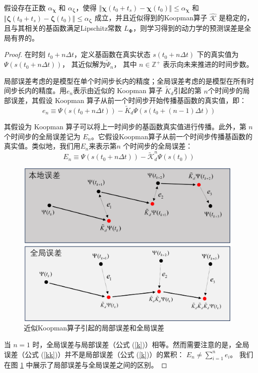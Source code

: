 \documentclass[lang=chs, degree=master, blindreview=false, winfonts=true]{yanputhesis}
\begin{document}
\begin{theorem}\label{error_boundness}
	假设存在正数 $\alpha_{\bm{\chi}}$ 和 $\alpha_{\bm{\zeta}}$，使得 $\Vert \bm{\chi}(t_0+t_s)-\bm{\chi}(t_0)\Vert \le \alpha_{\bm{\chi}}$ 和 $\Vert \bm{\zeta}(t_0+t_s) - \bm{\zeta}(t_0) \Vert \le \alpha_{\bm{\zeta}}$ 成立，并且近似得到的Koopman算子 $\hat{\bm{\mathcal{K}}}$ 是稳定的，且与其相关的基函数满足Lipschitz常数 $L_{\bm{\Phi}}$，则学习得到的动力学的预测误差是全局有界的。
\end{theorem}
\begin{proof}
	
在时刻 \( t_0 + n\Delta t \)，定义基函数在真实状态 \( s(t_0 + n\Delta t) \) 下的真实值为 
$
\Psi(s(t_0 + n\Delta t))$，
其近似解为$
\tilde{\Psi}_n
$，
其中 $ n \in \mathbb{Z}^+ $ 表示向未来推进的时间步数。

局部误差考虑的是模型在单个时间步长内的精度；全局误差考虑的是模型在所有时间步长内的精度。用$e_n$表示由近似的 Koopman 算子 \( \tilde{K}_d \)引起的第 
\( n \)个时间步的局部误差，其假设 Koopman 算子从前一个时间步开始传播基函数的真实值，即：
\begin{equation}
	e_n\equiv\Psi(s(t_0+n\Delta t))-\tilde{K}_d\Psi(s(t_0+(n-1)\Delta t))
	\label{k}
\end{equation}

其假设为 Koopman 算子可以将上一时间步的基函数真实值进行传播。此外，第 \( n \) 个时间步的全局误差记为 $E_n$。它假设Koopman算子从前一个时间步传播基函数的真实值。类似地，我们用$E_n$来表示第\( n \) 个时间步的全局误差：	
\begin{equation}
	E_n\equiv\Psi(s(t_0+n\Delta t))-\tilde{\mathcal{K}}_d^n\Psi(s(t_0))
	\label{kk}
\end{equation}

\begin{figure}[hbt!]
	\centering
	\includegraphics[width=26pc]{picture/3_2.png} 
	\caption{近似Koopman算子引起的局部误差和全局误差} \label{3_2}
\end{figure}
当 \( n = 1 \) 时，全局误差与局部误差（公式 (\ref{k})）相等。然而需要注意的是，全局误差（公式 (\ref{kk})）并不是局部误差（公式 (\ref{k})）的累积： 
$
E_n \neq \sum_{i=1}^n e_i
$。
我们在图 \ref{3_2} 中展示了局部误差与全局误差之间的区别。


\end{proof}
\end{document}
